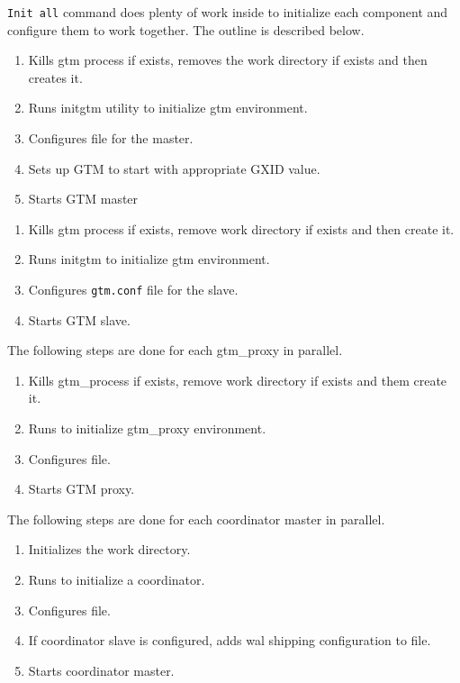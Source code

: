   \texttt{Init all} command does plenty of work inside to initialize each component and configure them to work together.
  The outline is described below.
  

    \begin{enumerate}
		\item Kills gtm process if exists, removes the work directory if exists and then creates it.
		\item Runs initgtm utility to initialize gtm environment.
		\item Configures  file for the master.
		\item Sets up GTM to start with appropriate GXID value.
		\item Starts GTM master
    \end{enumerate}


    \begin{enumerate}
		\item Kills gtm process if exists, remove work directory if exists and then create it.
		\item Runs initgtm to initialize gtm environment.
		\item Configures \verb|gtm.conf| file for the slave.
		\item Starts GTM slave.
    \end{enumerate}


    The following steps are done for each gtm\_proxy in parallel.
  
    \begin{enumerate}
		\item Kills gtm\_process if exists, remove work directory if exists and them create it.
		\item Runs  to initialize gtm\_proxy environment.
		\item Configures  file.
		\item Starts GTM proxy.
    \end{enumerate}


    The following steps are done for each coordinator master in parallel.
  
    \begin{enumerate}
		\item Initializes the work directory.
		\item Runs  to initialize a coordinator.
		\item Configures  file.
		\item If coordinator slave is configured, adds wal shipping configuration to
			   file.
		\item Starts coordinator master.
    \end{enumerate}

